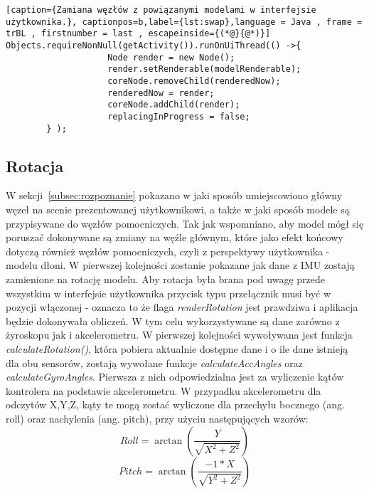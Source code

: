 \begin{lstlisting}[caption={Zamiana węzłów z powiązanymi modelami w interfejsie użytkownika.}, captionpos=b,label={lst:swap},language = Java , frame = trBL , firstnumber = last , escapeinside={(*@}{@*)}]     
Objects.requireNonNull(getActivity()).runOnUiThread(() ->{
                    Node render = new Node();
                    render.setRenderable(modelRenderable);
                    coreNode.removeChild(renderedNow);
                    renderedNow = render;
                    coreNode.addChild(render);
                    replacingInProgress = false;
        } );                                                      
\end{lstlisting}

	\subsection{Rotacja}
	\label{subsec:rotacja}
	W sekcji~\ref{subsec:rozpoznanie} pokazano w jaki sposób umiejscowiono główny węzeł na scenie prezentowanej użytkownikowi, a także w jaki sposób modele są przypisywane do węzłów pomocniczych. Tak jak wspomniano, aby model mógł się poruszać dokonywane są zmiany na węźle głównym, które jako efekt końcowy dotyczą również węzłów pomocniczych, czyli z perspektywy użytkownika - modelu dłoni. W pierwszej kolejności zostanie pokazane jak dane z IMU zostają zamienione na rotację modelu. Aby rotacja była brana pod uwagę przede wszystkim w interfejsie użytkownika przycisk typu przełącznik musi być w pozycji włączonej - oznacza to że flaga \textit{renderRotation} jest prawdziwa i aplikacja będzie dokonywała obliczeń. W tym celu wykorzystywane są dane zarówno z żyroskopu jak i akcelerometru. W pierwszej kolejności wywoływana jest funkcja \textit{calculateRotation()}, która pobiera aktualnie dostępne dane i o ile dane istnieją dla obu sensorów, zostają wywołane funkcje \textit{calculateAccAngles} oraz \textit{calculateGyroAngles}. Pierwsza z nich odpowiedzialna jest za wyliczenie kątów kontrolera na podstawie akcelerometru. W przypadku akcelerometru dla odczytów X,Y,Z, kąty te mogą zostać wyliczone dla przechyłu bocznego (ang. roll) oraz nachylenia (ang. pitch), przy użyciu następujących wzorów:
	$$
		Roll = \arctan\left(\frac{Y}{\sqrt{X^2 + Z^2}}\right)
	$$$$
		Pitch = \arctan\left(\frac{-1 * X}{\sqrt{Y^2 + Z^2}}\right)
	$$
